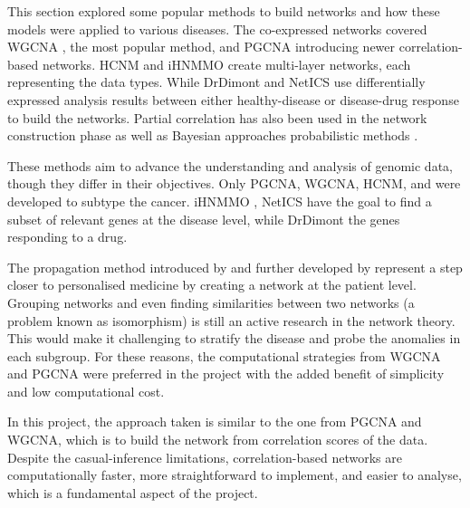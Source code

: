 This section explored some popular methods to build networks and how these models were applied to various diseases. The co-expressed networks covered WGCNA \citep{Langfelder2008-sn}, the most popular method, and PGCNA \citep{Care2019-ij} introducing newer correlation-based networks. HCNM \citep{Vangimalla2021-fc} and iHNMMO \citep{Peng2017-ik} create multi-layer networks, each representing the data types. While DrDimont \citep{Hiort2022-lk} and NetICS \citep{Dimitrakopoulos2018-br} use differentially expressed analysis results between either healthy-disease or disease-drug response to build the networks. Partial correlation has also been used in the network construction phase \citep{De_la_Fuente2004-ts} as well as Bayesian approaches probabilistic methods \citep{Nakazawa2021-yq, Tamada2011-ok, Tanaka2020-mw}.

These methods aim to advance the understanding and analysis of genomic data, though they differ in their objectives. Only PGCNA, WGCNA, HCNM, and \citep{Nakazawa2021-yq} were developed to subtype the cancer. iHNMMO \citep{Peng2017-ik}, NetICS \citep{Dimitrakopoulos2018-br} have the goal to find a subset of relevant genes at the disease level, while DrDimont \citep{Hiort2022-lk} the genes responding to a drug. 

The propagation method introduced by \citet{Hofree2013-ld} and further developed by \citet{He2017-dj} represent a step closer to personalised medicine by creating a network at the patient level. Grouping networks and even finding similarities between two networks (a problem known as isomorphism) is still an active research in the network theory. This would make it challenging to stratify the disease and probe the anomalies in each subgroup. For these reasons, the computational strategies from WGCNA and PGCNA were preferred in the project with the added benefit of simplicity and low computational cost.


In this project, the approach taken is similar to the one from PGCNA and WGCNA, which is to build the network from correlation scores of the data. Despite the casual-inference limitations, correlation-based networks are computationally faster, more straightforward to implement, and easier to analyse, which is a fundamental aspect of the project.
